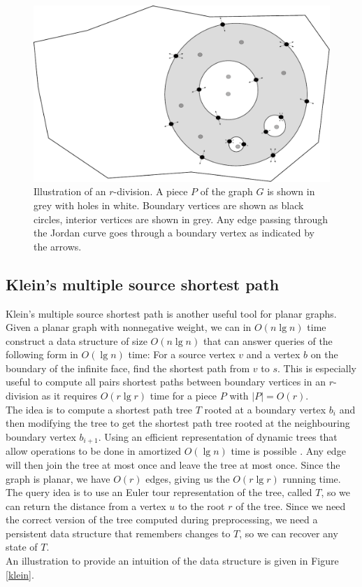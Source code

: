 \begin{figure}[h!]
  \includegraphics[width=1.0\textwidth]{figs/rdiv.pdf}
  \caption{Illustration of an $r$-division. A piece $P$ of the graph $G$ is shown in
  grey with holes in white. Boundary vertices are shown as black circles, interior vertices are shown in
grey. Any edge passing through the Jordan curve goes through a boundary vertex as
indicated by the arrows.}
    \label{rdiv}
\end{figure}

\subsection{Klein's multiple source shortest path}\label{klein2}
Klein's multiple source shortest path \cite{klein2005multiple} is another useful tool for planar
graphs. Given a planar graph with nonnegative weight, we can in $O(n\lg n)$ time construct a data structure
of size $O(n \lg n)$ that can answer queries of the following form in $O(\lg n)$ time:
For a source vertex $v$ and a vertex $b$ on the boundary of the infinite face, find the
shortest path from $v$ to $s$. This is especially useful to compute all pairs shortest paths between boundary
vertices in an $r$-division as it requires $O(r\lg r)$ time for a piece $P$ with
$|P|=O(r)$. \\
The idea is to compute a shortest path tree $T$ rooted at a boundary vertex
$b_i$ and then modifying the tree to get the shortest path tree rooted at the
neighbouring boundary vertex $b_{i+1}$. Using an efficient representation of dynamic
trees that allow operations to be done in amortized $O(\lg n)$ time is possible
\cite{tarjan2005self}\cite{henzinger1999randomized}. Any edge will then join the tree at
most once and leave the tree at most once. Since the graph is planar, we have $O(r)$ edges,
giving us the $O(r\lg r)$ running time. \\
The query idea is to use an Euler tour representation of the tree, called $T$, so we can
return the distance from a vertex $u$ to the root $r$ of the tree. Since we need the
correct version of the tree computed during preprocessing, we need a persistent data
structure that remembers changes to $T$, so we can recover any state of $T$. \\
An illustration to provide an intuition of the data structure is given in Figure
\ref{klein}.

